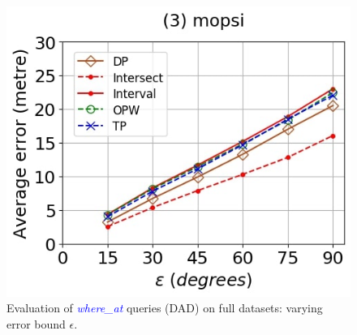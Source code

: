 {\begin{figure}[tb!]
	\includegraphics[scale = 0.250]{Figures/Exp-where-DAD-error-epsilon-mopsi.jpg}
	\vspace{-1ex}
	\caption{\small Evaluation of \textcolor{blue}{\emph{where\_at}} queries (DAD) on full datasets: varying error bound $\epsilon$.}
	\label{fig:query-dad-epsilon}
	\vspace{-1.0ex}
\end{figure}



}
